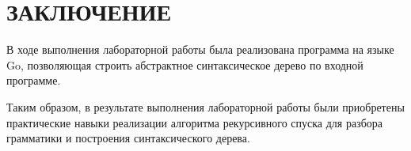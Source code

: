\chapter*{ЗАКЛЮЧЕНИЕ}

В ходе выполнения лабораторной работы была реализована программа
на языке Go, позволяющая строить абстрактное синтаксическое дерево по входной программе.

Таким образом, в результате выполнения лабораторной работы были
приобретены практические навыки реализации алгоритма рекурсивного спуска для разбора грамматики и построения синтаксического дерева.